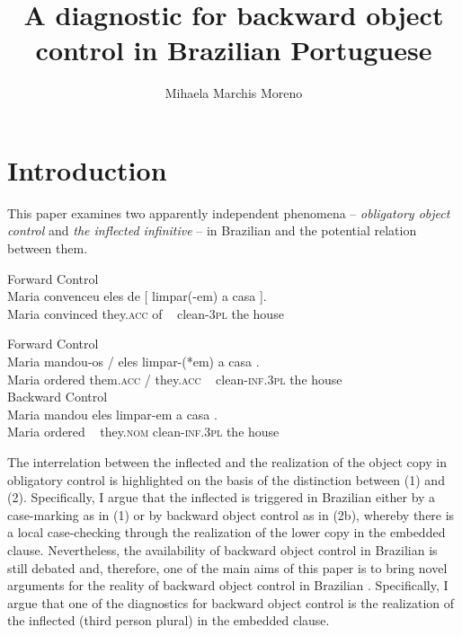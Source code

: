 \documentclass[output=paper]{langsci/langscibook}
\author{Mihaela Marchis Moreno\affiliation{FCSH, Universidade Nova de Lisboa}}
\title{A diagnostic for backward object control in Brazilian Portuguese}
\begin{document}
\section{Introduction}%
This paper examines two apparently independent phenomena – \textit{obligatory object control} and \textit{the inflected infinitive} – in Brazilian  and the potential relation between them.

\ea%
         Forward Control\label{ex:moreno:1}\\
    \gll Maria convenceu eles  de    [  limpar(-em)   a     casa ].\\
         Maria convinced they.\textsc{acc} of ~  clean-\textsc{3pl}  the house\\
\z

\ea\label{ex:moreno:2}%
    \ea  Forward Control\\
    \gll Maria  mandou-os                   /   eles        {\ob}  limpar-(*em) a     casa {\cb}.   \\
         Maria {ordered  them.\textsc{acc}} /   they.\textsc{acc}   ~   clean-\textsc{inf.3pl} the house\\
    \glt
    \ex  Backward Control\\
    \gll Maria mandou {\ob}    eles    limpar-em     a     casa {\cb}.\\
         Maria  ordered  ~  they.\textsc{nom}      clean-\textsc{inf.3pl}          the house\\
        \z
\z

The interrelation between the inflected  and the realization of the object copy in obligatory control is highlighted on the basis of the distinction between (1) and (2). Specifically, I argue that the inflected  is triggered in Brazilian  either by a case-marking  as in (1) or by backward object control as in (2b), whereby there is a local case-checking through the realization of the lower copy in the embedded clause. Nevertheless, the availability of backward object control in Brazilian  is still debated and, therefore, one of the main aims of this paper is to bring novel arguments for the reality of backward object control in Brazilian . Specifically, I argue that one of the diagnostics for backward object control is the realization of the inflected  (third person plural) in the embedded clause.
\end{document}
